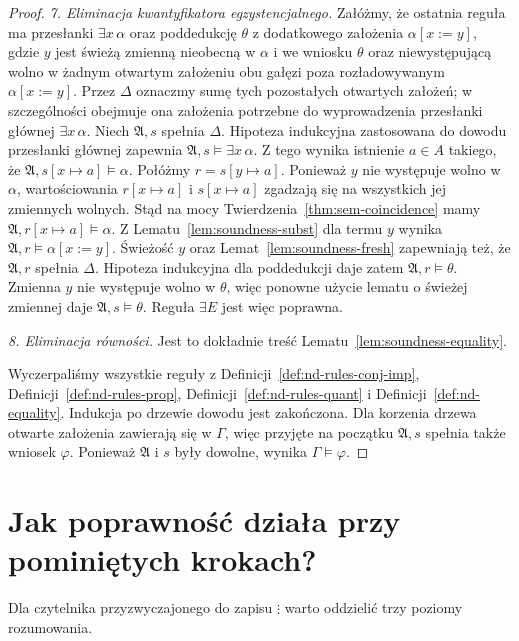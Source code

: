 \begin{proof}
\smallskip
\emph{7. Eliminacja kwantyfikatora egzystencjalnego.}
Załóżmy, że ostatnia reguła ma przesłanki
$\exists x\,\alpha$ oraz poddedukcję $\theta$ z dodatkowego
założenia $\alpha[x:=y]$, gdzie $y$ jest świeżą zmienną
nieobecną w $\alpha$ i we wniosku $\theta$ oraz niewystępującą
wolno w żadnym otwartym założeniu obu gałęzi poza
rozładowywanym $\alpha[x:=y]$. Przez $\Delta$ oznaczmy
sumę tych pozostałych otwartych założeń; w szczególności
obejmuje ona założenia potrzebne do wyprowadzenia
przesłanki głównej $\exists x\,\alpha$.
Niech $\mathfrak A,s$ spełnia $\Delta$.
Hipoteza indukcyjna zastosowana do dowodu przesłanki głównej
zapewnia $\mathfrak A,s\models\exists x\,\alpha$.
Z tego wynika istnienie
$a\in A$ takiego, że
$\mathfrak A,s[x\mapsto a]\models\alpha$.
Połóżmy $r=s[y\mapsto a]$.
Ponieważ $y$ nie występuje wolno w $\alpha$,
wartościowania $r[x\mapsto a]$ i $s[x\mapsto a]$
zgadzają się na wszystkich jej zmiennych wolnych.
Stąd na mocy Twierdzenia~\ref{thm:sem-coincidence}
mamy $\mathfrak A,r[x\mapsto a]\models\alpha$.
Z Lematu~\ref{lem:soundness-subst} dla termu $y$ wynika
$\mathfrak A,r\models\alpha[x:=y]$.
Świeżość $y$ oraz Lemat~\ref{lem:soundness-fresh}
zapewniają też, że $\mathfrak A,r$ spełnia $\Delta$.
Hipoteza indukcyjna dla poddedukcji daje zatem
$\mathfrak A,r\models\theta$. Zmienna $y$ nie występuje
wolno w $\theta$, więc ponowne użycie lematu o świeżej
zmiennej daje $\mathfrak A,s\models\theta$.
Reguła $\exists E$ jest więc poprawna.

\smallskip
\emph{8. Eliminacja równości.}
Jest to dokładnie treść Lematu~\ref{lem:soundness-equality}.

Wyczerpaliśmy wszystkie reguły z
Definicji~\ref{def:nd-rules-conj-imp},
Definicji~\ref{def:nd-rules-prop},
Definicji~\ref{def:nd-rules-quant} i
Definicji~\ref{def:nd-equality}.
Indukcja po drzewie dowodu jest zakończona.
Dla korzenia drzewa otwarte założenia zawierają się w $\Gamma$,
więc przyjęte na początku $\mathfrak A,s$ spełnia także wniosek
$\varphi$. Ponieważ $\mathfrak A$ i $s$ były dowolne,
wynika $\Gamma\models\varphi$.
\end{proof}


\section{Jak poprawność działa przy pominiętych krokach?}
Dla czytelnika przyzwyczajonego do zapisu $\vdots$
warto oddzielić trzy poziomy rozumowania.


